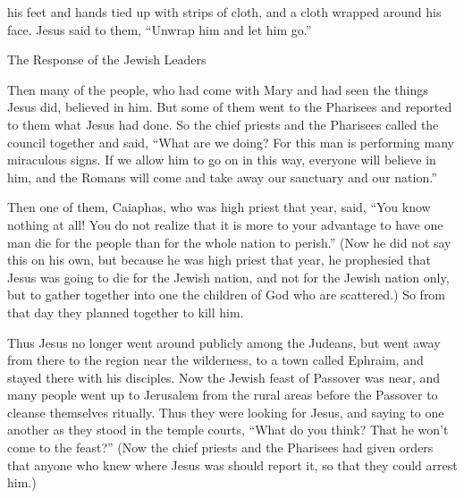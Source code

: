 {his feet
and
hands
tied up
with strips of cloth,
and
a cloth
wrapped around
his
face.
Jesus
said
to them,
“Unwrap
him
and
let
him
go.”
\par }{\SH The Response of the Jewish Leaders
\par }{\PP {}Then
many
of
the people,
who had come
with
Mary
and
had seen
the things Jesus did,
believed
in
him.
But
some
of
them
went
to
the Pharisees
and
reported
to them
what
Jesus
had done.
So
the chief priests
and
the Pharisees
called
the council
together
and
said,
“What
are we doing? For
this
man
is performing
many
miraculous signs.
If
we allow
him
to go on in this way,
everyone
will believe
in
him,
and
the Romans
will come
and
take away
our
sanctuary
and
our nation.”
\par }{\PP {}Then
one
of
them,
Caiaphas,
who was high priest
that
year,
said, “You
know
nothing at all!
You do
not
realize
that
it is more to
your
advantage
to
have one
man
die
for
the people
than for the whole
nation
to perish.”
(Now
he did
not
say
this
on
his own,
but
because he was high priest
that
year,
he prophesied
that
Jesus
was going
to die
for
the Jewish nation,
and
not
for
the Jewish nation
only,
but
to gather together
into
one
the children
of God
who are scattered.)
So
from
that
day
they planned together
to
kill
him.
\par }{\PP {}Thus
Jesus
no longer
went around
publicly
among
the Judeans,
but
went away
from there
to
the region
near
the wilderness,
to
a town
called
Ephraim,
and
stayed
there
with
his disciples.
Now the Jewish
feast of Passover
was
near,
and
many people
went up
to
Jerusalem
from
the rural areas
before
the Passover
to
cleanse
themselves
ritually.
Thus
they were looking for
Jesus,
and
saying
to
one another
as
they stood
in
the temple courts, “What
do
you
think? That
he
won’t
come
to
the feast?”
(Now
the chief priests
and
the Pharisees
had given
orders
that
anyone
who knew
where
Jesus was should report
it, so that
they could arrest
him.)

}
